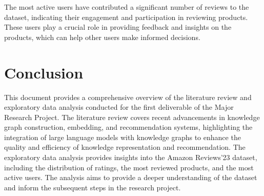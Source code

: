 \documentclass[11pt,a4paper,openany,oneside,titlepage]{article}
\begin{document}


The most active users have contributed a significant number of reviews to the dataset, indicating their engagement and participation in reviewing products. These users play a crucial role in providing feedback and insights on the products, which can help other users make informed decisions.

\section{Conclusion}

This document provides a comprehensive overview of the literature review and exploratory data analysis conducted for the first deliverable of the Major Research Project. The literature review covers recent advancements in knowledge graph construction, embedding, and recommendation systems, highlighting the integration of large language models with knowledge graphs to enhance the quality and efficiency of knowledge representation and recommendation. The exploratory data analysis provides insights into the Amazon Reviews'23 dataset, including the distribution of ratings, the most reviewed products, and the most active users. The analysis aims to provide a deeper understanding of the dataset and inform the subsequent steps in the research project.
\end{document}
